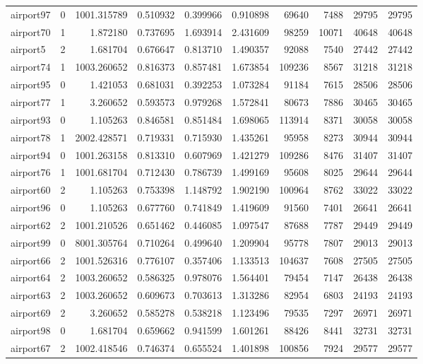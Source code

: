 \documentclass[../../../thesis.tex]{subfiles}
\begin{document}
\begin{longtable}{|l|r|r|r|r|r|r|r|r|r|}
airport97 & 0 & 1001.315789 & 0.510932 & 0.399966 & 0.910898 & 69640 & 7488 & 29795 & 29795 \\
airport70 & 1 & 1.872180 & 0.737695 & 1.693914 & 2.431609 & 98259 & 10071 & 40648 & 40648 \\
airport5 & 2 & 1.681704 & 0.676647 & 0.813710 & 1.490357 & 92088 & 7540 & 27442 & 27442 \\
airport74 & 1 & 1003.260652 & 0.816373 & 0.857481 & 1.673854 & 109236 & 8567 & 31218 & 31218 \\
airport95 & 0 & 1.421053 & 0.681031 & 0.392253 & 1.073284 & 91184 & 7615 & 28506 & 28506 \\
airport77 & 1 & 3.260652 & 0.593573 & 0.979268 & 1.572841 & 80673 & 7886 & 30465 & 30465 \\
airport93 & 0 & 1.105263 & 0.846581 & 0.851484 & 1.698065 & 113914 & 8371 & 30058 & 30058 \\
airport78 & 1 & 2002.428571 & 0.719331 & 0.715930 & 1.435261 & 95958 & 8273 & 30944 & 30944 \\
airport94 & 0 & 1001.263158 & 0.813310 & 0.607969 & 1.421279 & 109286 & 8476 & 31407 & 31407 \\
airport76 & 1 & 1001.681704 & 0.712430 & 0.786739 & 1.499169 & 95608 & 8025 & 29644 & 29644 \\
airport60 & 2 & 1.105263 & 0.753398 & 1.148792 & 1.902190 & 100964 & 8762 & 33022 & 33022 \\
airport96 & 0 & 1.105263 & 0.677760 & 0.741849 & 1.419609 & 91560 & 7401 & 26641 & 26641 \\
airport62 & 2 & 1001.210526 & 0.651462 & 0.446085 & 1.097547 & 87688 & 7787 & 29449 & 29449 \\
airport99 & 0 & 8001.305764 & 0.710264 & 0.499640 & 1.209904 & 95778 & 7807 & 29013 & 29013 \\
airport66 & 2 & 1001.526316 & 0.776107 & 0.357406 & 1.133513 & 104637 & 7608 & 27505 & 27505 \\
airport64 & 2 & 1003.260652 & 0.586325 & 0.978076 & 1.564401 & 79454 & 7147 & 26438 & 26438 \\
airport63 & 2 & 1003.260652 & 0.609673 & 0.703613 & 1.313286 & 82954 & 6803 & 24193 & 24193 \\
airport69 & 2 & 3.260652 & 0.585278 & 0.538218 & 1.123496 & 79535 & 7297 & 26971 & 26971 \\
airport98 & 0 & 1.681704 & 0.659662 & 0.941599 & 1.601261 & 88426 & 8441 & 32731 & 32731 \\
airport67 & 2 & 1002.418546 & 0.746374 & 0.655524 & 1.401898 & 100856 & 7924 & 29577 & 29577 \\

\end{longtable}
\end{document}
